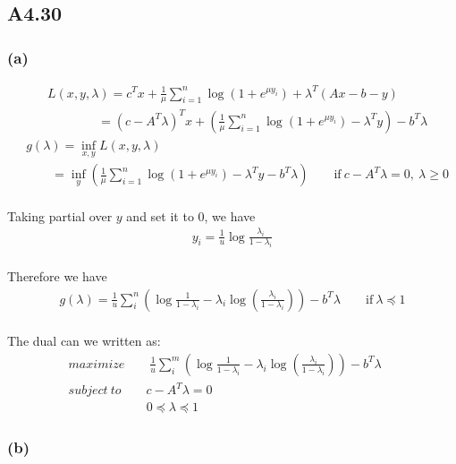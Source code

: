 \subsection*{A4.30}
\subsubsection*{(a)}
\begin{align*}
&L(x,y, \lambda) = c^Tx +\frac{1}{\mu}\sum_{i=1}^{n}\log(1+e^{\mu y_i}) + \lambda^T(Ax-b-y)\\
&\qquad \qquad = (c-A^T\lambda)^Tx+(\frac{1}{\mu}\sum_{i=1}^{n}\log(1+e^{\mu y_i})-\lambda^Ty) -b^T\lambda
\end{align*}
\begin{align*}
&g(\lambda) =\inf_{x, y}L(x, y ,\lambda)\\
&\qquad = \inf_y (\frac{1}{\mu}\sum_{i=1}^{n}\log(1+e^{\mu y_i})-\lambda^Ty -b^T\lambda) \qquad \text{if}\ c-A^T\lambda = 0,\ \lambda \geq 0
\end{align*}
\paragraph{}
Taking partial over $y$ and set it to 0, we have
\begin{align*}
y_i = \frac{1}{u}\log \frac{\lambda_i}{1-\lambda_i}
\end{align*}
\paragraph{}
Therefore we have
\begin{align*}
g(\lambda) = \frac{1}{u}\sum_i^n(\log\frac{1}{1-\lambda_i}-\lambda_i \log(\frac{\lambda_i}{1- \lambda_i}))-b^T\lambda \qquad \text{if} \ \lambda \preceq 1
\end{align*}
\paragraph{}
The dual can we written as:
\begin{align*}
&maximize \qquad \frac{1}{u}\sum_i^m(\log\frac{1}{1-\lambda_i}-\lambda_i \log(\frac{\lambda_i}{1- \lambda_i}))-b^T\lambda \qquad\\
&subject \ to \qquad c-A^T\lambda = 0\\
&\qquad \qquad \qquad \ 0 \preceq \lambda \preceq 1
\end{align*}
\subsubsection*{(b)}
